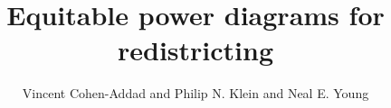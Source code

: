 \title{Equitable power diagrams for redistricting}
\author{Vincent Cohen-Addad and Philip N. Klein and Neal E. Young}

\begin{abstract}

\end{abstract}

